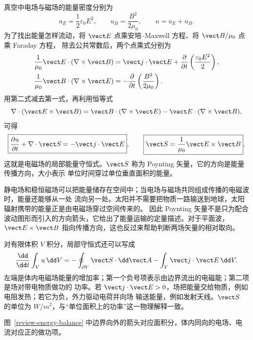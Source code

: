 真空中电场与磁场的能量密度分别为
\begin{equation}
  u_E=\frac12\varepsilon_0E^2,
  \qquad
  u_B=\frac{B^2}{2\mu_0},
  \qquad u=u_E+u_B.
\end{equation}
为了找出能量怎样流动，将 $\vect E$ 点乘安培--Maxwell 方程、将 $\vect B/\mu_0$ 点乘 Faraday 方程，
除去公共常数后，两个点乘式分别为
\begin{align}
 \frac1{\mu_0}\vect E\cdot(\nabla\times\vect B)
   &=\vect j\cdot\vect E+\frac{\partial}{\partial t}
      \left(\frac{\varepsilon_0E^2}{2}\right),\\
 \frac1{\mu_0}\vect B\cdot(\nabla\times\vect E)
   &=-\frac{\partial}{\partial t}\left(\frac{B^2}{2\mu_0}\right).
\end{align}
用第二式减去第一式，再利用恒等式
\begin{equation}
  \nabla\cdot(\vect E\times\vect B)
  =\vect B\cdot(\nabla\times\vect E)-
  \vect E\cdot(\nabla\times\vect B),
\end{equation}
可得
\begin{equation}
  \boxed{\frac{\partial u}{\partial t}+\nabla\cdot\vect S=-\vect j\cdot\vect E},
  \qquad
  \boxed{\vect S=\frac{1}{\mu_0}\vect E\times\vect B}.
\end{equation}
这就是电磁场的局部能量守恒式。$\vect S$ 称为 Poynting 矢量，它的方向是能量传播方向，大小表示
单位时间穿过单位垂直面积的能量。

静电场和稳恒磁场可以把能量储存在空间中；当电场与磁场共同组成传播的电磁波时，能量还能够从一处
流向另一处。太阳并不需要把物质一路输送到地球，太阳辐射携带的能量正是由电磁场穿过空间传来的。
因此 Poynting 矢量不是只为配合波动图形而引入的方向箭头，它给出了能量运输的定量描述。对于平面波，
$\vect E\times\vect B$ 指向传播方向，这也反过来帮助判断两场矢量的相对取向。

对有限体积 $V$ 积分，局部守恒式还可以写成
\begin{equation}
  \frac{\dd}{\dd t}\int_Vu\,\dd V
  =-\oint_{\partial V}\vect S\cdot\dd\vect A-
  \int_V\vect j\cdot\vect E\,\dd V.
\end{equation}
左端是体内电磁场能量的增加率；第一个负号项表示由边界流出的电磁能；第二项是场对带电物质做功的
功率。若 $\vect j\cdot\vect E>0$，场把能量交给物质，例如电阻发热；若它为负，外力驱动电荷并向场
输送能量，例如发射天线。$\vect S$ 的单位为 $\si{W/m^2}$，与“单位面积上的功率”这一物理解释一致。

图~\ref{review-energy-balance} 中边界向外的箭头对应面积分，体内同向的电场、电流对应正的做功项。

\poyntingBalanceDiagram

